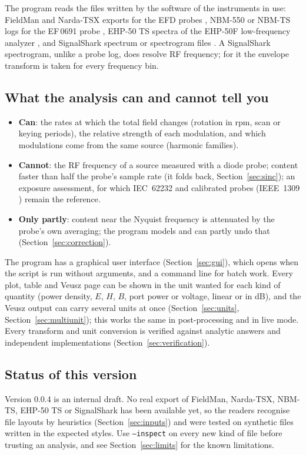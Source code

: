 \documentclass[10pt,letterpaper]{article}
\numberwithin{equation}{section}
\begin{document}
The program reads the files written by the software of the instruments in use:
FieldMan and Narda-TSX exports for the EFD probes \cite{R5,R9}, NBM-550 or
NBM-TS logs for the EF\,0691 probe \cite{R6}, EHP-50 TS spectra of the EHP-50F
low-frequency analyzer \cite{R7}, and SignalShark spectrum or spectrogram files
\cite{R8}. A SignalShark spectrogram, unlike a probe log, does resolve RF
frequency; for it the envelope transform is taken for every frequency bin.

\subsection{What the analysis can and cannot tell you}
\begin{itemize}
\item \textbf{Can}: the rates at which the total field changes (rotation in rpm,
scan or keying periods), the relative strength of each modulation, and which
modulations come from the same source (harmonic families).
\item \textbf{Cannot}: the RF frequency of a source measured with a diode probe;
content faster than half the probe's sample rate (it folds back, Section~\ref{sec:sinc});
an exposure assessment, for which IEC~62232 \cite{R18} and calibrated probes
(IEEE~1309 \cite{R17}) remain the reference.
\item \textbf{Only partly}: content near the Nyquist frequency is attenuated by
the probe's own averaging; the program models and can partly undo that
(Section~\ref{sec:correction}).
\end{itemize}

The program has a graphical user interface (Section~\ref{sec:gui}), which opens
when the script is run without arguments, and a command line for batch work.
Every plot, table and Veusz page can be shown in the unit wanted for each kind
of quantity (power density, $E$, $H$, $B$, port power or voltage, linear or in
dB), and the Veusz output can carry several units at once
(Section~\ref{sec:units}, Section~\ref{sec:multiunit}); this works the same in
post-processing and in live mode. Every transform and unit conversion is
verified against analytic answers and independent implementations
(Section~\ref{sec:verification}).

\subsection{Status of this version}
Version 0.0.4 is an internal draft. No real export of FieldMan,
Narda-TSX, NBM-TS, EHP-50 TS or SignalShark has been available yet, so the
readers recognise file layouts by heuristics (Section~\ref{sec:inputs}) and
were tested on synthetic files written in the expected styles. Use
\texttt{--inspect} on every new kind of file before trusting an analysis, and
see Section~\ref{sec:limits} for the known limitations.
\end{document}
